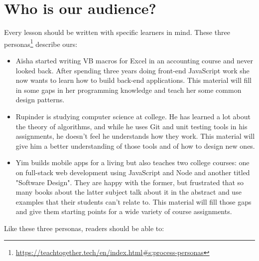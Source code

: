 \documentclass[krantzl]{krantz}
\newcommand{\hreffoot}[2]{{#1}\footnote{\href{#2}{#2}}}
\begin{document}
\section{Who is our audience?}\label{introduction-audience}


Every lesson should be written with specific learners in mind.
These three \hreffoot{personas}{https://teachtogether.tech/en/index.html\#s:process-personas} describe ours:

\begin{itemize}

\item 

Aïsha started writing VB macros for Excel in an accounting course and never looked back.
    After spending three years doing front-end JavaScript work
    she now wants to learn how to build back-end applications.
    This material will fill in some gaps in her programming knowledge
    and teach her some common design patterns.



\item 

Rupinder is studying computer science at college.
    He has learned a lot about the theory of algorithms,
    and while he uses Git and unit testing tools in his assignments,
    he doesn't feel he understands how they work.
    This material will give him a better understanding of those tools
    and of how to design new ones.



\item 

Yim builds mobile apps for a living
    but also teaches two college courses:
    one on full-stack web development using JavaScript and Node
    and another titled "Software Design".
    They are happy with the former,
    but frustrated that so many books about the latter subject talk about it in the abstract
    and use examples that their students can't relate to.
    This material will fill those gaps
    and give them starting points for a wide variety of course assignments.



\end{itemize}


Like these three personas, readers should be able to:
\end{document}
